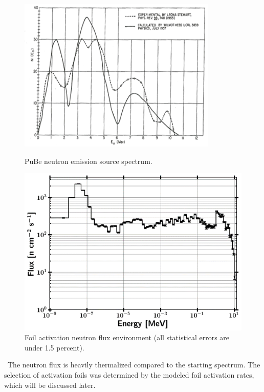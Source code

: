 \documentclass[journal]{IEEEtran}
\let\MYoriglatexcaption\caption
\renewcommand{\caption}[2][\relax]{\MYoriglatexcaption[#2]{#2}}
\begin{document}
	\begin{figure}[h!]
	\includegraphics[width=\linewidth]{Figures/PuBe.png}
	\caption{PuBe neutron emission source spectrum.}
	\label{fig:PuBE}

	\vskip 0.25cm

	\includegraphics[width=\linewidth]{Figures/PileSpec.png}
	\caption{Foil activation neutron flux environment (all statistical errors are under 1.5 percent).}
	\label{fig:Spec1}
	\end{figure}

	\ The neutron flux is heavily thermalized compared to the starting spectrum. The selection of activation foils was determined by the modeled foil activation rates, which will be discussed later. 
	
\end{document}
